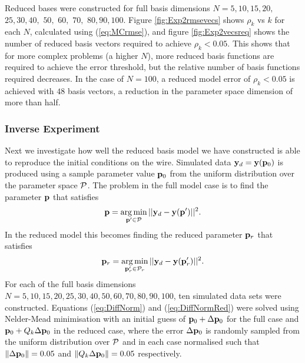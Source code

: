 Reduced bases were constructed for full basis dimensions $N=5, 10, 15, 20,$ $25, 30, 40,$ $50,$ $60,$ $70,$ $80, 90, 100$. Figure \ref{fig:Exp2rmsevecs} shows $\rho_k$ vs $k$ for each $N$, calculated using (\ref{eq:MCrmse}), and figure \ref{fig:Exp2vecsreq} shows the number of reduced basis vectors required to achieve $\rho_k < 0.05$. This shows that for more complex problems (a higher $N$), more reduced basis functions are required to achieve the error threshold, but the relative number of basis functions required decreases. In the case of $N=100$, a reduced model error of $\rho_k<0.05$ is achieved with $48$ basis vectors, a reduction in the parameter space dimension of more than half.


\subsubsection{Inverse Experiment}
Next we investigate how well the reduced basis model we have constructed is able to reproduce the initial conditions on the wire. Simulated data ${\mathbf{y}}_d={\mathbf{y}}({\mathbf{p}}_0)$ is produced using a sample parameter value ${\mathbf{p}}_0$ from the uniform distribution over the parameter space $\mathcal{P}$. The problem in the full model case is to find the parameter ${\mathbf{p}}$ that satisfies  
\begin{equation}\label{eq:DiffNorm}
{\mathbf{p}}=\operatorname*{arg\,min}_{{\mathbf{p}}' \in \mathcal{P}} ||\mathbf{y}_d-\mathbf{y}(\mathbf{p}')||^2.
\end{equation}
In the reduced model this becomes finding the reduced parameter ${\mathbf{p}}_r$ that satisfies
\begin{equation}\label{eq:DiffNormRed}
{\mathbf{p}}_r=\operatorname*{arg\,min}_{{\mathbf{p}}'_r \in \mathcal{P}_r} ||\mathbf{y}_d-\mathbf{y}(\mathbf{p}'_r)||^2.
\end{equation}
For each of the full basis dimensions $N=5,10,15,20,25,30,40,50,60,70,80,90,100$, ten simulated data sets were constructed. Equations (\ref{eq:DiffNorm}) and (\ref{eq:DiffNormRed}) were solved using Nelder-Mead minimisation with an initial guess of ${\mathbf{p}}_0+\Delta {\mathbf{p}}_0$ for the full case and ${\mathbf{p}}_0+ Q_k \Delta {\mathbf{p}}_0$ in the reduced case, where the error $\Delta {\mathbf{p}}_0$ is randomly sampled from the uniform distribution over $\mathcal{P}$ and in each case normalised such that $\|\Delta {\mathbf{p}}_0\|=0.05$ and $\|Q_k \Delta {\mathbf{p}}_0\|=0.05$ respectively. 

